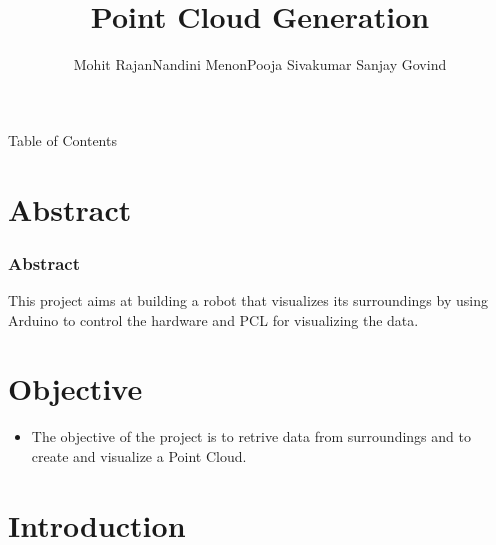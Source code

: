 \documentclass{beamer}
\title[Design Project]{Point Cloud Generation}
\author{Mohit Rajan\newline Nandini Menon\newline Pooja Sivakumar   \newline Sanjay Govind}
\institute[FISAT] %
{
FISAT \\ %
\medskip
}
\begin{document}
\begin{frame}
\titlepage %
\end{frame}

\begin{frame}{Table of Contents}
\tableofcontents
\newpage
\end{frame}


\section{Abstract} %

\begin{frame}
\frametitle{Abstract}
 This project aims at building a robot that visualizes its surroundings  by using  Arduino to control the hardware  and PCL  for  visualizing the data.
\end{frame}

\section{Objective}
\begin{frame}
\begin{itemize}
\item The objective of the project is to retrive data from surroundings and to create and visualize a Point Cloud.
\end{itemize}
\end{frame}



\section{Introduction}
\end{document}
